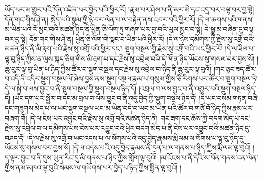 ཡོད་པར་མ་གྱུར་པའི་དོན་འཛིན་པར་བྱེད་པའི་ཕྱིར་རོ། །རྣམ་པར་ཤེས་པ་ནི་མར་མེ་དང་འདྲ་བར་བལྟ་བར་བྱ་སྟེ། དོན་གང་གིས་ཤེ་ན། སྲེད་པའི་སྣུམ་གྱི་ཉེ་བར་ལེན་པ་ལ་བརྟེན་ནས་འབར་བའི་ཕྱིར་རོ། །དེ་ལ་ཆགས་པའི་གནས་མ་ཡིན་པའི་རོ་མྱང་བའི་མཚན་ཉིད་ནི་ཕྱིན་ཅི་ལོག་ཏུ་གཞག་པར་བྱ་བའི་ཡུལ་མྱང་བ་སྟེ། དེ་སྒྱུ་མ་བཞིན་དུ་བལྟ་བར་བྱ་སྟེ། དོན་གང་གིས་ཤེ་ན། ཕྱིན་ཅི་ལོག་གི་སྣང་བ་ཡིན་པའི་ཕྱིར་རོ། །དེ་ལ་ཉེས་དམིགས་ཀྱི་རྗེས་སུ་འགྲོ་བའི་མཚན་ཉིད་ནི་མི་རྟག་པའི་རྗེས་སུ་འགྲོ་བའི་ཕྱིར་དང་། སྡུག་བསྔལ་གྱི་རྗེས་སུ་འགྲོ་བའི་ཡང་ཕྱིར་རོ། །དེ་ལ་ཟིལ་པ་ལྟ་བུ་ཉིད་ཀྱིས་ན་ལུས་སྐད་ཅིག་གིས་མི་རྟག་པ་དང་རྗེས་སུ་འབྲེལ་བའི་དེ་ཁོ་ན་ཉིད་ཡོངས་སུ་གསལ་བར་བྱས་སོ། །ཆུ་བུར་ལྟ་བུ་ཡིན་པ་ཉིད་ཀྱིས་ཚོར་བ་སྡུག་བསྔལ་དང་རྗེས་སུ་འབྲེལ་བ་ཉིད་ནི་ཆུ་བུར་ལྟ་བུའོ། །གང་ཅུང་ཟད་ཚོར་བ་འདི་ནི་འདིར་སྡུག་བསྔལ་ལོ་ཞེས་བྱས་ནས་སྡུག་བསྔལ་རྣམ་པ་གསུམ་གྱིས་ཅི་རིགས་པར་ཚོར་བ་སྡུག་བསྔལ་ཏེ། དེ་ལ་སྐྱེ་བ་ལས་བྱུང་བ་ནི་སྡུག་བསྔལ་གྱི་སྡུག་བསྔལ་ཉིད་དོ། །འབྲལ་བ་ལས་བྱུང་བ་ནི་འགྱུར་བའི་སྡུག་བསྔལ་ཉིད་དོ། །ཡང་དག་པར་སྦྱོར་བ་དང་མ་བྲལ་བ་ལས་བྱུང་བ་ནི་འདུ་བྱེད་ཀྱི་སྡུག་བསྔལ་ཉིད་དོ། །དེ་ཡང་བསམ་གཏན་བཞི་དང་གཟུགས་མེད་པ་ལ་ཡང་སྡུག་བསྔལ་ཡང་མ་ཡིན་བདེ་བ་ཡང་མ་ཡིན་པའི་ཚོར་བ་གཙོ་བོ་ཉིད་ཀྱིས་རྣམ་པར་བཞག་གོ། །དེ་ལ་ངེས་པར་འབྱུང་བའི་རྗེས་སུ་འགྲོ་བའི་མཚན་ཉིད་ནི། གང་ཟག་དང་ཆོས་ཀྱི་བདག་མེད་པ་དང་རྗེས་སུ་འབྲེལ་བ་ལ་དམིགས་པས་ངེས་པར་འབྱུང་བའི་ཕྱིར་བདག་མེད་པ་ནི་ངེས་པར་འབྱུང་བའི་མཚན་ཉིད་དུ་བཤད་དོ། །དེ་ལ་རྗེས་སུ་འགྲོ་བ་ཡང་འདས་པ་ལ་སོགས་པའི་འདུ་བྱེད་རྣམས་རྨི་ལམ་ལ་སོགས་པ་ལྟ་བུ་ཉིད་དུ་ཡོངས་སུ་གསལ་བར་བྱས་སོ། །དེ་ལ་འདས་པའི་འདུ་བྱེད་རྣམས་ནི་དྲན་པ་ལ་གནས་པ་ཉིད་ཀྱིས་རྨི་ལམ་ལྟ་བུའོ། །ད་ལྟར་བྱུང་བ་ནི་དུས་ཡུན་རིང་དུ་མི་གནས་པ་ཉིད་ཀྱིས་གློག་ལྟ་བུའོ། །མ་འོངས་པ་ནི་དེའི་ས་བོན་གནས་ངན་ལེན་གྱིས་ནམ་མཁའ་ལྟ་བུའི་སེམས་ལ་གཡོགས་པར་བྱེད་པ་ཉིད་ཀྱིས་སྤྲིན་ལྟ་བུའོ། །

